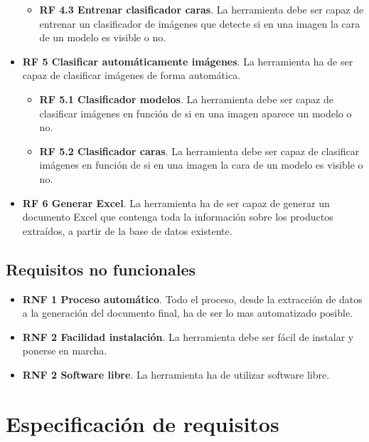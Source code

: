 \begin{itemize}
\begin{itemize}
        \item \textbf{RF 4.3 Entrenar clasificador caras}. La herramienta debe ser capaz de entrenar un clasificador de imágenes que detecte si en una imagen la cara de un modelo es visible o no.
    \end{itemize}
    \item \textbf{RF 5 Clasificar automáticamente imágenes}. La herramienta ha de ser capaz de clasificar imágenes de forma automática.
    \begin{itemize}
        \item \textbf{RF 5.1 Clasificador modelos}. La herramienta debe ser capaz de clasificar imágenes en función de si en una imagen aparece un modelo o no.
        \item \textbf{RF 5.2 Clasificador caras}. La herramienta debe ser capaz de clasificar imágenes en función de si en una imagen la cara de un modelo es visible o no.
    \end{itemize}
    \item \textbf{RF 6 Generar Excel}. La herramienta ha de ser capaz de generar un documento Excel que contenga toda la información sobre los productos extraídos, a partir de la base de datos existente. 
    
\end{itemize}

\subsection{Requisitos no funcionales}

\begin{itemize}
    \item \textbf{RNF 1 Proceso automático}. Todo el proceso, desde la extracción de datos a la generación del documento final, ha de ser lo mas automatizado posible.
    \item \textbf{RNF 2 Facilidad instalación}. La herramienta debe ser fácil de instalar y ponerse en marcha.
    \item \textbf{RNF 2 Software libre}. La herramienta ha de utilizar software libre.
\end{itemize}

\section{Especificación de requisitos}


